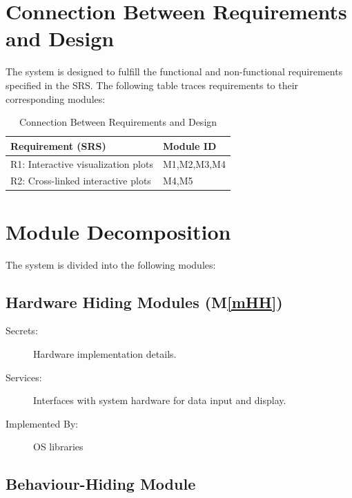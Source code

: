 \documentclass[12pt, titlepage]{article}
\newcommand{\mref}[1]{M\ref{#1}}
\begin{document}
\section{Connection Between Requirements and Design} \label{SecConnection}

The system is designed to fulfill the functional and non-functional requirements specified in the SRS. The following table traces requirements to their corresponding modules:

\begin{table}[h!]
\centering
\begin{tabular}{p{} p{}}
\toprule
\textbf{
Requirement (SRS)} &  \textbf{Module ID}\\
\midrule

{R1: Interactive visualization plots}
 & M1,M2,M3,M4 \\
\midrule

{R2: Cross-linked interactive plots}  & M4,M5\\
\bottomrule

\end{tabular}
\caption{Connection Between Requirements and Design}
\label{TblMH1}
\end{table}

\section{Module Decomposition} \label{SecMD}

The system is divided into the following modules:



\subsection{Hardware Hiding Modules (\mref{mHH})}

\begin{description}
\item[Secrets:]Hardware implementation details.


\item[Services:]Interfaces with system hardware for data input and display.


\item[Implemented By:]  OS libraries
\end{description}

\subsection{Behaviour-Hiding Module}
\end{document}
